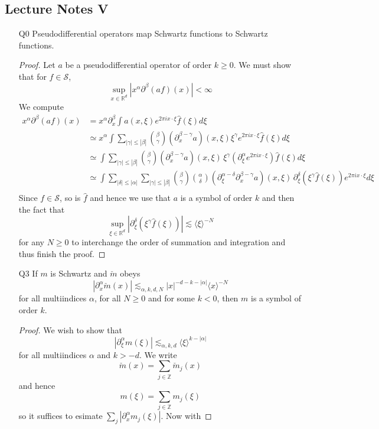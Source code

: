 \documentclass[11pt]{article}
\theoremstyle{remark}
\newcommand{\calS}{\mathcal{S}}
\newcommand{\1}{\textbf{1}}
\newcommand{\lle}{\lesssim}
\def\brac#1{\langle #1  \rangle}
\newcommand{\bbR}{\mathbb{R}}
\newcommand{\bbZ}{\mathbb{Z}}
\begin{document}
\subsection*{Lecture Notes V}
\begin{enumerate}
\item[Q0] Pseudodifferential operators map Schwartz functions to Schwartz functions.
\begin{proof}
Let $a$ be a pseudodifferential operator of order $k \geq 0$. We must show that for $f \in \calS$,
\[
\sup_{x \in \bbR^d}| x^\alpha \partial^\beta (af)(x) | < \infty
\]
We compute
\begin{align*}
 x^\alpha \partial^\beta (af)(x) &= x^\alpha \partial_x^\beta \int a(x,\xi) e^{2 \pi ix \cdot \xi} \hat{f}(\xi) d\xi \\
& \simeq x^\alpha \int \sum_{|\gamma| \leq |\beta|} \binom{\beta}{\gamma}(\partial_x^{\beta - \gamma} a)(x,\xi) \xi^\gamma e^{2 \pi ix \cdot \xi} \hat{f}(\xi) d\xi \\
 &\simeq \int \sum_{|\gamma| \leq |\beta|} \binom{\beta}{\gamma}(\partial_x^{\beta - \gamma} a)(x,\xi) \,\xi^\gamma (\partial_\xi^\alpha e^{2 \pi ix \cdot \xi}) \hat{f}(\xi) d\xi \\
& \simeq \int \sum_{|\delta| \leq |\alpha|} \sum_{|\gamma| \leq |\beta|} \binom{\beta}{\gamma} \binom{\alpha}{\delta}(\partial_\xi^{\alpha-\delta} \partial_x^{\beta - \gamma} a)(x,\xi) \,\partial_\xi^\delta (\xi^\gamma \hat{f}(\xi)) e^{2 \pi ix \cdot \xi}  d\xi \\
\end{align*}
Since $f \in \calS$, so is $\hat{f}$ and hence we use that $a$ is a symbol of order $k$ and then the fact that
\[
\sup_{\xi \in \bbR^d} |\partial_\xi^\delta (\xi^\gamma \hat{f}(\xi))| \lle \brac{\xi}^{-N}
\]
for any $N \geq 0$ to interchange the order of summation and integration and thus finish the proof.
\end{proof}
\item[Q3] If $m$ is Schwartz and $\check{m}$ obeys
\[
|\partial_x^\alpha \check{m}(x)| \lle_{\alpha, k,d,N} |x|^{-d-k-|\alpha|} \brac{x}^{-N}
\]
for all multiindices $\alpha$, for all $N \geq 0$ and for some $k < 0$, then $m$ is a symbol of order $k$.
\begin{proof}
We wish to show that
\[
|\partial_\xi^\alpha m(\xi) | \lle_{\alpha,k ,d} \brac{\xi}^{k - |\alpha|}
\]
for all multiindices $\alpha$ and $k > -d$. We write
\[
\check{m}(x) = \sum_{j\in \bbZ} \check{m}_j(x)
\]
and hence
\[
m(\xi) = \sum_{j\in \bbZ} m_j(\xi)
\]
so it suffices to esimate $\sum_j |\partial_x^\alpha m_j(\xi)|$. Now with

\end{proof}
\end{enumerate}
\end{document}
